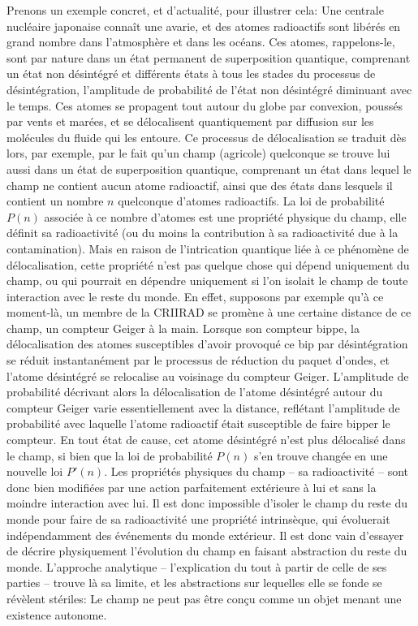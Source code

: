 Prenons un exemple concret, et d'actualité, pour illustrer cela:
Une centrale nucléaire japonaise connaît une avarie,
et des atomes radioactifs sont libérés en grand nombre dans l'atmosphère et dans les océans.
Ces atomes, rappelons-le, sont par nature dans un état permanent de superposition quantique,
comprenant un état non désintégré et différents états à tous les stades du processus de désintégration,
l'amplitude de probabilité de l'état non désintégré diminuant avec le temps.
Ces atomes se propagent tout autour du globe par convexion, poussés par vents et marées,
et se délocalisent quantiquement par diffusion sur les molécules du fluide qui les entoure.
Ce processus de délocalisation se traduit dès lors, par exemple, par le fait qu'un champ (agricole) quelconque
se trouve lui aussi dans un état de superposition quantique,
comprenant un état dans lequel le champ ne contient aucun atome radioactif,
ainsi que des états dans lesquels il contient un nombre $n$ quelconque d'atomes radioactifs.
La loi de probabilité $P(n)$ associée à ce nombre d'atomes est une propriété physique du champ,
elle définit sa radioactivité (ou du moins la contribution à sa radioactivité due à la contamination).
Mais en raison de l'intrication quantique liée à ce phénomène de délocalisation,
cette propriété n'est pas quelque chose qui dépend uniquement du champ,
ou qui pourrait en dépendre uniquement si l'on isolait le champ de toute interaction avec le reste du monde.
En effet, supposons par exemple qu'à ce moment-là,
un membre de la CRIIRAD se promène à une certaine distance de ce champ,
un compteur Geiger à la main.
Lorsque son compteur bippe,
la délocalisation des atomes susceptibles d'avoir provoqué ce bip par désintégration se réduit instantanément par le
processus de réduction du paquet d'ondes,
et l'atome désintégré se relocalise au voisinage du compteur Geiger.
L'amplitude de probabilité décrivant alors la délocalisation de l'atome désintégré autour du compteur Geiger varie
essentiellement avec la distance,
reflétant l'amplitude de probabilité avec laquelle l'atome radioactif était susceptible de faire bipper le compteur.
En tout état de cause,
cet atome désintégré n'est plus délocalisé dans le champ,
si bien que la loi de probabilité $P(n)$ s'en trouve changée en une nouvelle loi $P'(n)$.
Les propriétés physiques du champ – sa radioactivité – sont donc bien modifiées par une action parfaitement extérieure à
lui et sans la moindre interaction avec lui.
Il est donc impossible d'isoler le champ du reste du monde pour faire de sa radioactivité une propriété intrinsèque,
qui évoluerait indépendamment des événements du monde extérieur.
Il est donc vain d'essayer de décrire physiquement l'évolution du champ en faisant abstraction du reste du monde.
L'approche analytique – l'explication du tout à partir de celle de ses parties – trouve là sa limite,
et les abstractions sur lequelles elle se fonde se révèlent stériles:
Le champ ne peut pas être conçu comme un objet menant une existence autonome.

